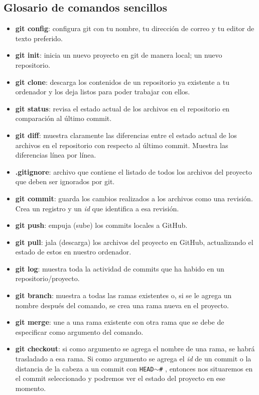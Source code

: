 \documentclass[10pt,letterpaper]{article}
\newcommand{\inlinecode}[1]{
\colorbox{light-gray}{\texttt{#1}}
}
\begin{document}
\subsection{Glosario de comandos sencillos}
\begin{small}
\begin{itemize}
\item \textbf{git config}: configura git con tu nombre, tu direcci\'on de correo y tu editor de texto preferido.
\item \textbf{git init}: inicia un nuevo proyecto en git de manera local; un nuevo repositorio.
\item \textbf{git clone}: descarga los contenidos de un repositorio ya existente a tu ordenador y los deja listos para poder trabajar con ellos.
\item \textbf{git status}: revisa el estado actual de los archivos en el repositorio en comparaci\'on al \'ultimo commit.
\item \textbf{git diff}: muestra claramente las diferencias entre el estado actual de los archivos en el repositorio con respecto al \'ultimo commit. Muestra las diferencias l\'inea por l\'inea.
\item \textbf{.gitignore}: archivo que contiene el listado de todos los archivos del proyecto que deben ser ignorados por git.
\item \textbf{git commit}: guarda los cambios realizados a los archivos como una revisi\'on. Crea un registro y un \emph{id} que identifica a esa revisi\'on.
\item \textbf{git push}: empuja (sube) los commits locales a GitHub.
\item \textbf{git pull}: jala (descarga) los archivos del proyecto en GitHub, actualizando el estado de estos en nuestro ordenador.
\item \textbf{git log}: muestra toda la actividad de commits que ha habido en un repositorio/proyecto.
\item \textbf{git branch}: muestra a todas las ramas existentes o, si se le agrega un nombre despu\'es del comando, se crea una rama nueva en el proyecto.
\item \textbf{git merge}: une a una rama existente con otra rama que se debe de especificar como argumento del comando.
\item \textbf{git checkout}: si como argumento se agrega el nombre de una rama, se habr\'a trasladado a esa rama. Si como argumento se agrega el \emph{id} de un commit o la distancia de la cabeza a un commit con \inlinecode{HEAD$\sim$\#}, entonces nos situaremos en el commit seleccionado y podremos ver el estado del proyecto en ese momento.
\end{itemize}
\end{small}
\end{document}
